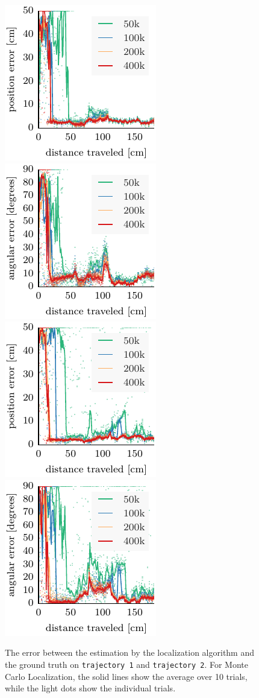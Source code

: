 \documentclass[letterpaper, 10pt, conference]{ieeeconf}
\begin{document}
\begin{figure}
\includegraphics{mcl-whole_random_1-xy}
\includegraphics{mcl-whole_random_1-theta}\hfill
\includegraphics{mcl-whole_random_2-xy}
\includegraphics{mcl-whole_random_2-theta}

\caption{The error between the estimation by the localization algorithm and the ground truth on \texttt{trajectory~1} and \texttt{trajectory~2}.
For Monte Carlo Localization, the solid lines show the average over 10 trials, while the light dots show the individual trials.}
\label{fig:whole-runs-random12}
\end{figure}
\end{document}
